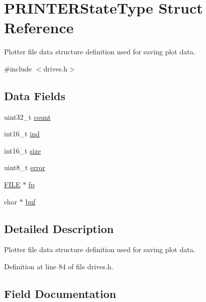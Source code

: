 \hypertarget{structPRINTERStateType}{}\section{P\+R\+I\+N\+T\+E\+R\+State\+Type Struct Reference}
\label{structPRINTERStateType}


Plotter file data structure definition used for saving plot data.  




{\ttfamily \#include $<$drives.\+h$>$}

\subsection*{Data Fields}
\begin{DoxyCompactItemize}
\item 
uint32\+\_\+t \hyperlink{structPRINTERStateType_ae115fc351910f3801e37b31f254fb8f4}{count}
\item 
int16\+\_\+t \hyperlink{structPRINTERStateType_a7d8873d0011f31d7dd00c2b7e0d362bd}{ind}
\item 
int16\+\_\+t \hyperlink{structPRINTERStateType_ac6d8323e47879ed58e7fa2cc7cfd7c30}{size}
\item 
uint8\+\_\+t \hyperlink{structPRINTERStateType_a6e5b550f5396901febd5475445132dd0}{error}
\item 
\hyperlink{posix_8h_aed4dabeb9f7c518ded42f930a04abce8}{F\+I\+LE} $\ast$ \hyperlink{structPRINTERStateType_a791c78d68d169f9d2e60d34b890e520a}{fp}
\item 
char $\ast$ \hyperlink{structPRINTERStateType_aa48220761aa3c77c954a55f09388c615}{buf}
\end{DoxyCompactItemize}


\subsection{Detailed Description}
Plotter file data structure definition used for saving plot data. 

Definition at line 84 of file drives.\+h.



\subsection{Field Documentation}
\mbox{\label{structPRINTERStateType_aa48220761aa3c77c954a55f09388c615}} 
